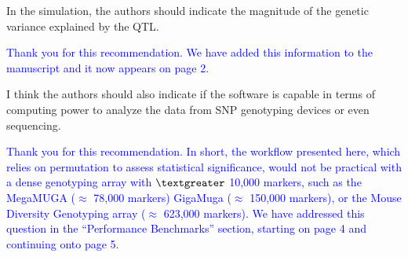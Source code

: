 \documentclass[11pt]{article}
\newcommand{\ReviewerQuestion}[1]{
  \vspace{5pt}\goodbreak
  \noindent\fbox{Reviewer:} #1
  \normalfont\par
}
\newcommand{\Response}[1]{
  \goodbreak
  \textcolor{blue}{#1}
  \normalfont\par
}
\begin{document}
\ReviewerQuestion{
  In the simulation, the authors should indicate the magnitude of the genetic variance explained by the QTL.
}
\Response{
  Thank you for this recommendation.
  We have added this information to the manuscript and it now appears on page 2.
}


\ReviewerQuestion{
  I think the authors should also indicate if the software is capable in terms of computing power to analyze the data from SNP genotyping devices or even sequencing.
}

\Response{
  Thank you for this recommendation.
  In short, the workflow presented here, which relies on permutation to assess statistical significance, would not be practical with a dense genotyping array with $\textgreater$ 10,000 markers, such as the MegaMUGA ($\approx$ 78,000 markers) GigaMuga ($\approx$ 150,000 markers), or the Mouse Diversity Genotyping array ($\approx$ 623,000 markers).
  We have addressed this question in the ``Performance Benchmarks'' section, starting on page 4 and continuing onto page 5.
}
\end{document}
